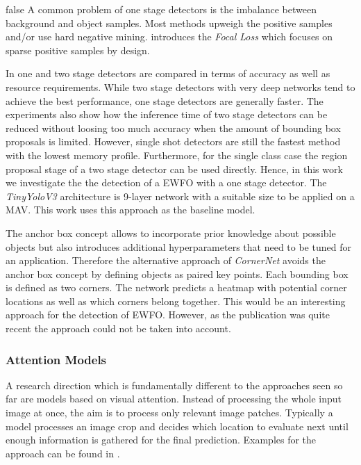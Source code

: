 \if false
A common problem of one stage detectors is the imbalance between background and object samples. Most methods upweigh the positive samples and/or use hard negative mining. \cite{Lin} introduces the \textit{Focal Loss} which focuses on sparse positive samples by design.
\fi

In \cite{Huang} one and two stage detectors are compared in terms of accuracy as well as resource requirements. While two stage detectors with very deep networks tend to achieve the best performance, one stage detectors are generally faster. The experiments also show how the inference time of two stage detectors can be reduced without loosing too much accuracy when the amount of bounding box proposals is limited. However, single shot detectors are still the fastest method with the lowest memory profile. Furthermore, for the single class case the region proposal stage of a two stage detector can be used directly. Hence, in this work we investigate the the detection of a \ac{EWFO} with a one stage detector. The \textit{TinyYoloV3} architecture is 9-layer network with a suitable size to be applied on a \ac{MAV}. This work uses this approach as the baseline model.

The anchor box concept allows to incorporate prior knowledge about possible objects but also introduces additional hyperparameters that need to be tuned for an application. Therefore the alternative approach of \textit{CornerNet}\cite{Law2018} avoids the anchor box concept by defining objects as paired key points. Each bounding box is defined as two corners. The network predicts a heatmap with potential corner locations as well as which corners belong together. This would be an interesting approach for the detection of \ac{EWFO}. However, as the publication was quite recent the approach could not be taken into account. 

\subsubsection{Attention Models}

A research direction which is fundamentally different to the approaches seen so far are models based on visual attention. Instead of processing the whole input image at once, the aim is to process only relevant image patches. Typically a model processes an image crop and decides which location to evaluate next until enough information is gathered for the final prediction. Examples for the approach can be found in \cite{Itti1998,Ba2014,Ablavatski2017a}.

